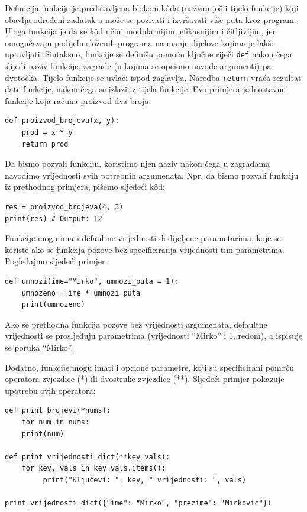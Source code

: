 Definicija funkcije je predstavljena blokom k\^oda (nazvan još i tijelo funkcije) koji obavlja određeni zadatak a može se pozivati i izvršavati više puta kroz program. Uloga funkcija je da se k\^od učini modularnijim, efikasnijim i čitljivijim, jer omogućavaju  podijelu složenih programa na manje dijelove kojima je lakše upravljati.  Sintaksno, funkcije se definišu pomoću ključne riječi \texttt{def} nakon čega slijedi naziv funkcije, zagrade (u kojima se opciono navode argu\-menti) pa dvotočka. Tijelo funkcije se uvlači ispod zaglavlja. Naredba \texttt{return} vraća rezultat date funkcije, nakon čega se izlazi iz tijela funkcije. Evo primjera jednostavne funkcije koja računa proizvod dva broja:

\begin{verbatim}
def proizvod_brojeva(x, y):
    prod = x * y
    return prod
\end{verbatim}

Da bismo pozvali funkciju, koristimo njen naziv nakon čega u zagradama navodimo vrijednosti svih potrebnih argumenata. Npr. da bismo pozvali funkciju iz prethodnog primjera, pišemo sljedeći k\^od:

\begin{verbatim}
res = proizvod_brojeva(4, 3)
print(res) # Output: 12
\end{verbatim}

Funkcije mogu imati defaultne vrijednosti dodijeljene parametarima, koje se koriste ako se funkcija pozove bez specificiranja vrijednosti tim parametrima.  Pogledajmo sljedeći primjer:
\begin{verbatim}
def umnozi(ime="Mirko", umnozi_puta = 1):
    umnozeno = ime * umnozi_puta
    print(umnozeno)
\end{verbatim}
Ako se prethodna funkcija pozove bez   vrijednosti argumenata, defaultne vrijednosti se prosljeđuju parametrima (vrijednosti ``Mirko'' i 1, redom), a ispisuje se poruka ``Mirko''. 

Dodatno, funkcije mogu imati i opcione parametre, koji su specifici\-rani pomoću operatora zvjezdice (*) ili dvostruke zvjezdice (**). Sljede\-ći primjer pokazuje upotrebu ovih operatora:
\begin{verbatim}
def print_brojevi(*nums):
    for num in nums:
    print(num)
    
def print_vrijednosti_dict(**key_vals):
    for key, vals in key_vals.items():
         print("Ključevi: ", key, " vrijednosti: ", vals)    

print_vrijednosti_dict({"ime": "Mirko", "prezime": "Mirkovic"})
\end{verbatim}

